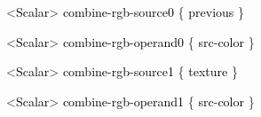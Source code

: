 \documentclass[a4paper]{article}
\newcommand\textstyleOOoComputerKeyWord[1]{\textrm{\textcolor[rgb]{0.0,0.0,0.5019608}{#1}}}
\newcommand\textstyleOOoAssemblerSpecialChar[1]{\textrm{\textcolor[rgb]{0.0,0.5019608,0.0}{#1}}}
\newcommand\textstyleOOoAssemblerIdent[1]{\textrm{\textcolor{black}{#1}}}
\begin{document}
{\color{black}
\textstyleOOoComputerKeyWord{\textcolor{black}{\ \ \ \ \ \ }}\textstyleOOoAssemblerSpecialChar{{\textless}}\textstyleOOoAssemblerIdent{Scalar}\textstyleOOoAssemblerSpecialChar{{\textgreater}}\textstyleOOoComputerKeyWord{\textcolor{black}{
}}\textstyleOOoAssemblerIdent{combine}\textstyleOOoAssemblerSpecialChar{{}-}\textstyleOOoAssemblerIdent{rgb}\textstyleOOoAssemblerSpecialChar{{}-}\textstyleOOoAssemblerIdent{source0}\textstyleOOoComputerKeyWord{\textcolor{black}{
}}\textstyleOOoAssemblerSpecialChar{\{}\textstyleOOoComputerKeyWord{\textcolor{black}{
}}\textstyleOOoAssemblerIdent{previous}\textstyleOOoComputerKeyWord{\textcolor{black}{
}}\textstyleOOoAssemblerSpecialChar{\}}}

\clearpage
\bigskip

{\color{black}
\textstyleOOoComputerKeyWord{\textcolor{black}{\ \ \ \ \ \ }}\textstyleOOoAssemblerSpecialChar{{\textless}}\textstyleOOoAssemblerIdent{Scalar}\textstyleOOoAssemblerSpecialChar{{\textgreater}}\textstyleOOoComputerKeyWord{\textcolor{black}{
}}\textstyleOOoAssemblerIdent{combine}\textstyleOOoAssemblerSpecialChar{{}-}\textstyleOOoAssemblerIdent{rgb}\textstyleOOoAssemblerSpecialChar{{}-}\textstyleOOoAssemblerIdent{operand0}\textstyleOOoComputerKeyWord{\textcolor{black}{
}}\textstyleOOoAssemblerSpecialChar{\{}\textstyleOOoComputerKeyWord{\textcolor{black}{
}}\textstyleOOoAssemblerIdent{src}\textstyleOOoAssemblerSpecialChar{{}-}\textstyleOOoAssemblerIdent{color}\textstyleOOoComputerKeyWord{\textcolor{black}{
}}\textstyleOOoAssemblerSpecialChar{\}}}

{\color{black}
\textstyleOOoComputerKeyWord{\textcolor{black}{\ \ \ \ \ \ }}\textstyleOOoAssemblerSpecialChar{{\textless}}\textstyleOOoAssemblerIdent{Scalar}\textstyleOOoAssemblerSpecialChar{{\textgreater}}\textstyleOOoComputerKeyWord{\textcolor{black}{
}}\textstyleOOoAssemblerIdent{combine}\textstyleOOoAssemblerSpecialChar{{}-}\textstyleOOoAssemblerIdent{rgb}\textstyleOOoAssemblerSpecialChar{{}-}\textstyleOOoAssemblerIdent{source1}\textstyleOOoComputerKeyWord{\textcolor{black}{
}}\textstyleOOoAssemblerSpecialChar{\{}\textstyleOOoComputerKeyWord{\textcolor{black}{
}}\textstyleOOoAssemblerIdent{texture}\textstyleOOoComputerKeyWord{\textcolor{black}{
}}\textstyleOOoAssemblerSpecialChar{\}}}

{\color{black}
\textstyleOOoComputerKeyWord{\textcolor{black}{\ \ \ \ \ \ }}\textstyleOOoAssemblerSpecialChar{{\textless}}\textstyleOOoAssemblerIdent{Scalar}\textstyleOOoAssemblerSpecialChar{{\textgreater}}\textstyleOOoComputerKeyWord{\textcolor{black}{
}}\textstyleOOoAssemblerIdent{combine}\textstyleOOoAssemblerSpecialChar{{}-}\textstyleOOoAssemblerIdent{rgb}\textstyleOOoAssemblerSpecialChar{{}-}\textstyleOOoAssemblerIdent{operand1}\textstyleOOoComputerKeyWord{\textcolor{black}{
}}\textstyleOOoAssemblerSpecialChar{\{}\textstyleOOoComputerKeyWord{\textcolor{black}{
}}\textstyleOOoAssemblerIdent{src}\textstyleOOoAssemblerSpecialChar{{}-}\textstyleOOoAssemblerIdent{color}\textstyleOOoComputerKeyWord{\textcolor{black}{
}}\textstyleOOoAssemblerSpecialChar{\}}}
\end{document}
